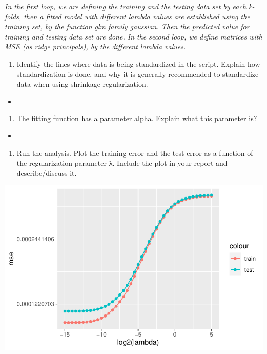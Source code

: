 \documentclass[
  letterpaper,
  DIV=11,
  numbers=noendperiod]{scrartcl}
\providecommand{\tightlist}{%
  \setlength{\itemsep}{0pt}\setlength{\parskip}{0pt}}\usepackage{longtable,booktabs,array}
\begin{document}
\emph{In the first loop, we are defining the training and the testing
data set by each k-folds, then a fitted model with different lambda
values are established using the training set, by the function glm
family gaussian. Then the predicted value for training and testing data
set are done. In the second loop, we define matrices with MSE (as ridge
principals), by the different lambda values.}

\begin{enumerate}
\def\labelenumi{(\alph{enumi})}
\setcounter{enumi}{4}
\tightlist
\item
  Identify the lines where data is being standardized in the script.
  Explain how standardization is done, and why it is generally
  recommended to standardize data when using shrinkage regularization.
\end{enumerate}

\begin{itemize}
\tightlist
\item
\end{itemize}

\begin{enumerate}
\def\labelenumi{(\alph{enumi})}
\setcounter{enumi}{5}
\tightlist
\item
  The fitting function has a parameter alpha. Explain what this
  parameter is?
\end{enumerate}

\begin{itemize}
\tightlist
\item
\end{itemize}

\begin{enumerate}
\def\labelenumi{(\alph{enumi})}
\setcounter{enumi}{6}
\tightlist
\item
  Run the analysis. Plot the training error and the test error as a
  function of the regularization parameter λ. Include the plot in your
  report and describe/discuss it.
\end{enumerate}

\includegraphics{excercise_doc_files/figure-pdf/unnamed-chunk-20-1.pdf}
\end{document}

